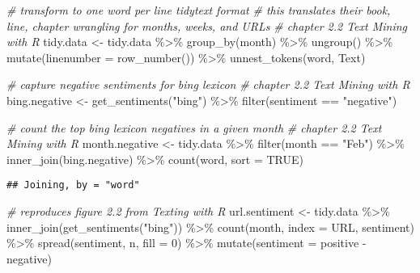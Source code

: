 \documentclass[
]{article}
\newenvironment{Shaded}{\begin{snugshade}}{\end{snugshade}}
\newcommand{\AttributeTok}[1]{\textcolor[rgb]{0.77,0.63,0.00}{#1}}
\newcommand{\CommentTok}[1]{\textcolor[rgb]{0.56,0.35,0.01}{\textit{#1}}}
\newcommand{\ConstantTok}[1]{\textcolor[rgb]{0.00,0.00,0.00}{#1}}
\newcommand{\DecValTok}[1]{\textcolor[rgb]{0.00,0.00,0.81}{#1}}
\newcommand{\FunctionTok}[1]{\textcolor[rgb]{0.00,0.00,0.00}{#1}}
\newcommand{\NormalTok}[1]{#1}
\newcommand{\OtherTok}[1]{\textcolor[rgb]{0.56,0.35,0.01}{#1}}
\newcommand{\SpecialCharTok}[1]{\textcolor[rgb]{0.00,0.00,0.00}{#1}}
\newcommand{\StringTok}[1]{\textcolor[rgb]{0.31,0.60,0.02}{#1}}
\begin{document}
\begin{Shaded}
\begin{Highlighting}[]
\CommentTok{\# transform to one word per line tidytext format}
\CommentTok{\# this translates their book, line, chapter wrangling for months, weeks, and URLs}
\CommentTok{\# chapter 2.2 Text Mining with R}
\NormalTok{tidy.data }\OtherTok{\textless{}{-}}\NormalTok{ tidy.data }\SpecialCharTok{\%\textgreater{}\%}
  \FunctionTok{group\_by}\NormalTok{(month) }\SpecialCharTok{\%\textgreater{}\%}
  \FunctionTok{ungroup}\NormalTok{() }\SpecialCharTok{\%\textgreater{}\%}
  \FunctionTok{mutate}\NormalTok{(}\AttributeTok{linenumber =} \FunctionTok{row\_number}\NormalTok{()) }\SpecialCharTok{\%\textgreater{}\%}
  \FunctionTok{unnest\_tokens}\NormalTok{(word, Text)}

\CommentTok{\# capture negative sentiments for bing lexicon}
\CommentTok{\# chapter 2.2 Text Mining with R}
\NormalTok{bing.negative }\OtherTok{\textless{}{-}} \FunctionTok{get\_sentiments}\NormalTok{(}\StringTok{"bing"}\NormalTok{) }\SpecialCharTok{\%\textgreater{}\%}
  \FunctionTok{filter}\NormalTok{(sentiment }\SpecialCharTok{==} \StringTok{"negative"}\NormalTok{)}

\CommentTok{\# count the top bing lexicon negatives in a given month}
\CommentTok{\# chapter 2.2 Text Mining with R}
\NormalTok{month.negative }\OtherTok{\textless{}{-}}\NormalTok{ tidy.data }\SpecialCharTok{\%\textgreater{}\%}
  \FunctionTok{filter}\NormalTok{(month }\SpecialCharTok{==} \StringTok{"Feb"}\NormalTok{) }\SpecialCharTok{\%\textgreater{}\%}
  \FunctionTok{inner\_join}\NormalTok{(bing.negative) }\SpecialCharTok{\%\textgreater{}\%}
  \FunctionTok{count}\NormalTok{(word, }\AttributeTok{sort =} \ConstantTok{TRUE}\NormalTok{)}
\end{Highlighting}
\end{Shaded}

\begin{verbatim}
## Joining, by = "word"
\end{verbatim}

\begin{Shaded}
\begin{Highlighting}[]
\CommentTok{\# reproduces figure 2.2 from Texting with R}
\NormalTok{url.sentiment }\OtherTok{\textless{}{-}}\NormalTok{ tidy.data }\SpecialCharTok{\%\textgreater{}\%}
  \FunctionTok{inner\_join}\NormalTok{(}\FunctionTok{get\_sentiments}\NormalTok{(}\StringTok{"bing"}\NormalTok{)) }\SpecialCharTok{\%\textgreater{}\%}
  \FunctionTok{count}\NormalTok{(month, }\AttributeTok{index =}\NormalTok{ URL, sentiment) }\SpecialCharTok{\%\textgreater{}\%}
  \FunctionTok{spread}\NormalTok{(sentiment, n, }\AttributeTok{fill =} \DecValTok{0}\NormalTok{) }\SpecialCharTok{\%\textgreater{}\%}
  \FunctionTok{mutate}\NormalTok{(}\AttributeTok{sentiment =}\NormalTok{ positive }\SpecialCharTok{{-}}\NormalTok{ negative)}
\end{Highlighting}
\end{Shaded}
\end{document}

